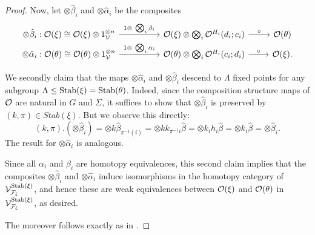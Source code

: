 \documentclass[a4paper,10pt
,draft
]{article}%
\renewcommand{\F}{\mathcal F}
\renewcommand{\1}{\ensuremath{\mathbb{id}}}
\begin{document}
\begin{proof}
      Now, let $\otimes \hat \beta_i$ and $\otimes \hat \alpha_i$ be the composites
      \begin{equation}
            \begin{tikzcd}[row sep = tiny]
                  \otimes \hat \beta_i :
                  \O(\xi)
                  \cong
                  \O(\xi) \otimes 1_\V^{\otimes n} \arrow[rr, "1 \otimes\ \bigotimes_i \beta_i"]
                  &&
                  \O(\xi) \otimes \bigotimes_i \O^{H_i}(d_i;c_i) \arrow[r,"\circ"]
                  &
                  \O(\theta)
                  \\
                  \otimes \hat \alpha_i : 
                  \O(\theta)
                  \cong
                  \O(\theta) \otimes 1_\V^{\otimes n} \arrow[rr, "1 \otimes\ \bigotimes_i \alpha_i"]
                  &&
                  \O(\theta) \otimes \bigotimes_i \O^{H_i}(c_i;d_i) \arrow[r,"\circ"]
                  &
                  \O(\xi).
            \end{tikzcd}
      \end{equation}

      We secondly claim that the maps $\otimes \hat \alpha_i$ and $\otimes \hat \beta_i$ descend to $\Lambda$ fixed points 
      for any subgroup $\Lambda \leq \mathrm{Stab}(\xi) = \mathrm{Stab}(\theta)$.
      Indeed, since the composition structure maps of $\mathcal{O}$ are natural in $G$ and $\Sigma$,
      it suffices to show that $\otimes \hat \beta_i$ is preserved by $(k,\pi)\in Stab(\xi)$.
      But we observe this directly:
      \begin{equation}
            (k, \pi) . (\otimes \hat \beta_i)
            =
            \otimes k \hat\beta_{\pi^{-1}(i)}
            =
            \otimes k k_{\pi^{-1}i} \hat \beta
            =
            \otimes k_i h_i \hat \beta
            =
            \otimes k_i \hat \beta
            =
            \otimes \hat \beta_i.
      \end{equation}
      The result for $\otimes \hat \alpha_i$ is analogous.
      
      Since all $\alpha_i$ and $\beta_i$ are homotopy equivalences,
      this second claim implies that the composites $\otimes \hat \beta_i$ and $\otimes \hat \alpha_i$
      induce isomorphisms in the homotopy category of $\V^{\Stab(\xi)}_{\F_\xi}$,
      and hence these are weak equivalences between $\mathcal{O}(\xi)$ and $\mathcal{O}(\theta)$ in $\V^{\Stab(\xi)}_{\F_\xi}$,
      as desired.

      The moreover follows exactly as in \cite{Cav14}.
\end{proof}
\end{document}
